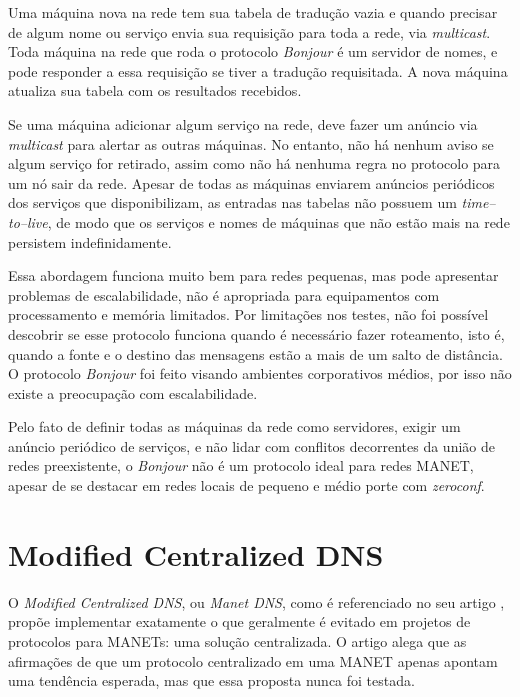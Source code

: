    Uma máquina nova na rede tem sua tabela de tradução vazia e quando 
    precisar de algum nome ou serviço envia sua requisição para toda a rede,
    via \textit{multicast}. Toda máquina na rede que roda o protocolo
    \textit{Bonjour} é um servidor de nomes, e pode responder a essa 
    requisição se tiver a tradução requisitada. A nova máquina atualiza sua 
    tabela com os resultados recebidos.

    Se uma máquina adicionar algum serviço na rede, deve fazer um anúncio via
    \textit{multicast} para alertar as outras máquinas. No entanto, não há 
    nenhum aviso se algum serviço for retirado, assim como não há nenhuma 
    regra no protocolo para um nó sair da rede. Apesar de todas as máquinas 
    enviarem anúncios periódicos dos serviços que disponibilizam, as entradas
    nas tabelas não possuem um \textit{time--to--live}, de modo que os serviços
    e nomes de máquinas que não estão mais na rede persistem indefinidamente.

    Essa abordagem funciona muito bem para redes pequenas, mas pode apresentar
    problemas de escalabilidade, não é apropriada para equipamentos com 
    processamento e memória limitados. Por limitações nos testes, não foi possível
    descobrir se esse protocolo funciona quando é necessário fazer roteamento,
    isto é, quando a fonte e o destino das mensagens estão a mais de um salto
    de distância. O protocolo \textit{Bonjour} foi feito visando ambientes 
    corporativos médios, por isso não existe a preocupação com escalabilidade.

    Pelo fato de definir todas as máquinas da rede como servidores, exigir um
    anúncio periódico de serviços, e não lidar com conflitos decorrentes da união
    de redes preexistente, o \textit{Bonjour} não é um protocolo ideal para redes
    MANET, apesar de se destacar em redes locais de pequeno e médio porte com
    \textit{zeroconf}.


\section{Modified Centralized DNS}
\label{MCDNS}

    O \textit{Modified Centralized DNS}, ou \textit{Manet DNS}, como é referenciado
    no seu artigo \cite{mcdns}, propõe implementar exatamente o que geralmente é
    evitado em projetos de protocolos para MANETs: uma solução centralizada.
    O artigo alega que as afirmações de que um protocolo centralizado em uma MANET
    apenas apontam uma tendência esperada, mas que essa proposta nunca foi testada.
  
